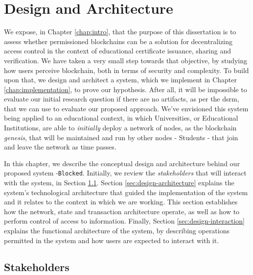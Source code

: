\chapter{Design and Architecture}
\label{chap:design}

We expose, in Chapter \ref{chap:intro}, that the purpose of this dissertation is to assess whether permissioned blockchains can be a solution for decentralizing access control in the context of educational certificate issuance, sharing and verification. We have taken a very small step towards that objective, by studying how users perceive blockchain, both in terms of security and complexity. To build upon that, we design and architect a system, which we implement in Chapter \ref{chap:implementation}, to prove our hypothesis. After all, it will be impossible to evaluate our initial research question if there are no artifacts, as per the \gls{dsrm}, that we can use to evaluate our proposed approach. We've envisioned this system being applied to an educational context, in which Universities, or Educational Institutions, are able to \textit{initially} deploy a network of nodes, as the blockchain \textit{genesis}, that will be maintained and run by other nodes - Students - that join and leave the network as time passes.

In this chapter, we describe the conceptual design and architecture behind our proposed system -\texttt{Blocked}. Initially, we review the \textit{stakeholders} that will interact with the system, in Section \ref{sec:design-entities}. Section \ref{sec:design-architecture} explains the system's technological architecture that guided the implementation of the system and it relates to the context in which we are working. This section establishes how the network, state and transaction architecture operate, as well as how to perform control of access to information. Finally, Section \ref{sec:design-interaction} explains the functional architecture of the system, by describing operations permitted in the system and how users are expected to interact with it.

\section{Stakeholders}
\label{sec:design-entities}

